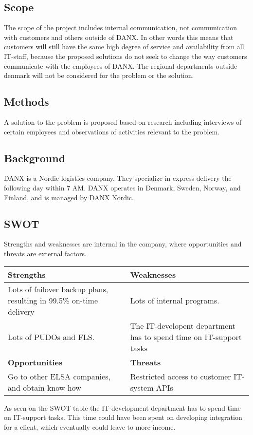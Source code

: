 \subsection{Scope}
The scope of the project includes internal communication, not communication with customers and others outside of DANX. In other words this means that customers will still have the same high degree of service and availability from all IT-staff, because the proposed solutions do not seek to change the way customers communicate with the employees of DANX. The regional departments outside denmark will not be considered for the problem or the solution.

\subsection{Methods}
A solution to the problem is proposed based on research including interviews of certain employees and observations of activities relevant to the problem.

\subsection{Background}
DANX is a Nordic logistics company. They specialize in express delivery the following day within 7 AM. DANX operates in Denmark, Sweden, Norway, and Finland, and is managed by DANX Nordic.

\subsection{SWOT}
Strengths and weaknesses are internal in the company, where opportunities and threats are external factors.

\begin{tabular}{| p{} | p{} |}
\hline
\rowcolor{GR}
\textbf{Strengths} & \textbf{Weaknesses} \\ \hline
Lots of failover backup plans, resulting in 99.5\% on-time delivery & Lots of internal programs.
\\ \hline
Lots of PUDOs and FLS. & The IT-developent department has to spend time on IT-support tasks \\ \hline \hline
\rowcolor{GR}
\textbf{Opportunities} & \textbf{Threats} \\ \hline
Go to other ELSA companies, and obtain know-how & Restricted access to customer IT-system APIs \\ \hline
\end{tabular}
\qquad

As seen on the SWOT table the IT-development department has to spend time on IT-support tasks. This time could have been spent on developing integration for a client, which eventually could leave to more income.